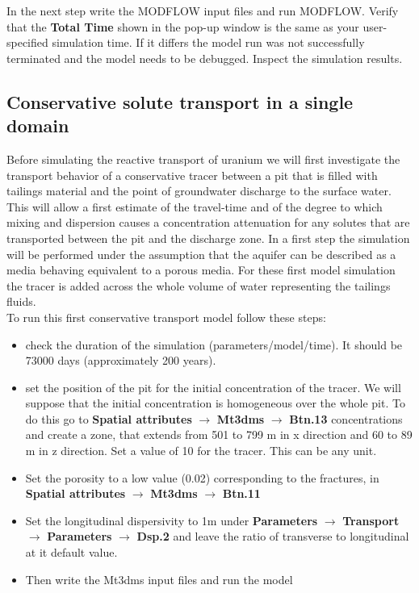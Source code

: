 In the next step write the MODFLOW input files and run MODFLOW.
Verify that the {\color{blue}\textbf{Total Time}} shown in the  
pop-up window is the same as your user-specified simulation time. 
If it differs the model run was
not successfully terminated and the model needs to be debugged. 
Inspect the simulation results.

\subsection{Conservative solute transport in a single domain}

Before simulating the reactive transport of uranium we will 
first investigate the transport behavior of a conservative tracer
between a pit that is filled with tailings material and the point of
groundwater discharge to the surface water.
This will allow a first estimate of the travel-time and of the degree
to which mixing and dispersion causes a concentration attenuation 
for any solutes that are transported between the pit and the discharge zone.
In a first step the simulation will be performed under the assumption that 
the aquifer can be described as a media behaving equivalent to a porous media. 
 For these first model simulation the tracer is added across the whole volume 
of water representing the tailings fluids. \\
To run this first conservative transport model follow these steps:

\begin{itemize}
\item check the duration of the simulation (parameters/model/time). 
It should be 73000 days (approximately 200 years).
\item	set the position of the pit for the initial concentration 
of the tracer. We will suppose that the initial concentration 
is homogeneous over the whole pit. 
To do this go to 
{\color{blue}\textbf{Spatial attributes}} 
$\rightarrow$ {\color{blue}\textbf{Mt3dms}} 
$\rightarrow$ {\color{blue}\textbf{Btn.13}}
concentrations and create a zone, that extends from 501 to 799 m in x direction 
and 60 to 89 m in z direction. Set a value of 10 for the tracer. 
This can be any unit.
\item Set the porosity to a low value (0.02) corresponding to the fractures, in 
{\color{blue}\textbf{Spatial attributes}} 
$\rightarrow$ {\color{blue}\textbf{Mt3dms}} 
$\rightarrow$ {\color{blue}\textbf{Btn.11}}
\item Set the longitudinal dispersivity to 1m 
under 
{\color{blue}\textbf{Parameters}} 
$\rightarrow$ {\color{blue}\textbf{Transport}} 
$\rightarrow$ {\color{blue}\textbf{Parameters}}
$\rightarrow$ {\color{blue}\textbf{Dsp.2}}
and leave the ratio of transverse to longitudinal at it default value.
\item Then write the Mt3dms input files and run the model
\end{itemize}

